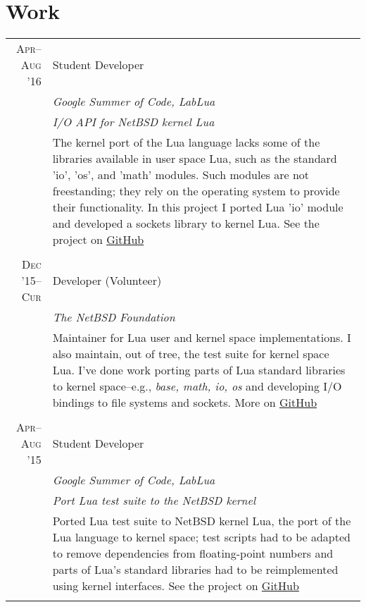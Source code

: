 \documentclass[a4paper,10pt]{article}
\begin{document}
\section{Work}

\begin{longtable}{r|p{11cm}}

  \textsc{Apr--Aug '16} & Student Developer \\
  &\emph{Google Summer of Code, LabLua}\\
  &\emph{\footnotesize{I/O API for NetBSD kernel Lua}}\\
  &\footnotesize{The kernel port of the Lua language lacks some of the libraries
  available in user space Lua, such as the standard 'io', 'os', and 'math' modules. 
  Such modules are not freestanding; they rely on the operating system to provide
  their functionality. In this project I ported Lua 'io' module and developed a 
  sockets library to kernel Lua. See the project on 
  \href{https://GitHub.com/salazar/luaio}{GitHub}}
  \\\multicolumn{2}{c}{} \\

  \textsc{Dec '15--Cur}
  & Developer (Volunteer)\\
  &\emph{The NetBSD Foundation}\\
  &\footnotesize{Maintainer for Lua user and kernel space implementations. I
  also maintain, out of tree, the test suite for kernel space Lua. I've done
  work porting parts of Lua standard libraries to kernel space--e.g., \emph{base, 
  math, io, os} and developing I/O bindings to file systems and sockets. More 
  on \href{https://GitHub.com/salazar/netbsd}{GitHub}}
  \\\multicolumn{2}{c}{} \\
  
  \textsc{Apr--Aug '15}
  & Student Developer \\
  &\emph{Google Summer of Code, LabLua}\\
  &\emph{\footnotesize{Port Lua test
         suite to the NetBSD kernel}}\\
  &\footnotesize{Ported Lua test suite to NetBSD kernel Lua, the port of the Lua
  language to kernel space; test scripts
   had to be adapted to remove dependencies from floating-point numbers and parts
   of Lua's standard libraries had to be reimplemented using kernel interfaces.
   See the project on 
   \href{https://GitHub.com/salazar/luatests}{GitHub}}
  \\\multicolumn{2}{c}{} \\


\end{longtable}
\end{document}
